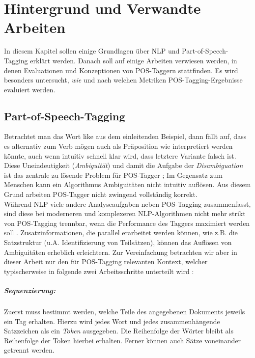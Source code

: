 %
\chapter{Hintergrund und Verwandte Arbeiten}
\label{sec:related}

In diesem Kapitel sollen einige Grundlagen über NLP und Part-of-Speech-Tagging erklärt werden. Danach soll auf einige Arbeiten verwiesen werden, in denen Evaluationen und Konzeptionen von POS-Taggern stattfinden. Es wird besonders untersucht, \textit{wie} und nach welchen Metriken POS-Tagging-Ergebnisse evaluiert werden.

\section{Part-of-Speech-Tagging}
\label{sec:related:pos}

Betrachtet man das Wort \glqq like\grqq{} aus dem einleitenden Beispiel, dann fällt auf, dass es alternativ zum Verb \glqq mögen\grqq{} auch als Präposition \glqq wie\grqq{} interpretiert werden könnte, auch wenn intuitiv schnell klar wird, dass letztere Variante falsch ist. Diese Uneindeutigkeit (\textit{Ambiguität}) und damit die Aufgabe der \textit{Disambiguation} ist das zentrale zu lösende Problem für POS-Tagger  \cite{Smith} \cite{Jones}; Im Gegensatz zum Menschen kann ein Algorithmus Ambiguitäten nicht intuitiv auflösen. Aus diesem Grund arbeiten POS-Tagger nicht zwingend vollständig korrekt.
\\
Während NLP viele andere Analyseaufgaben neben POS-Tagging zusammenfasst, sind diese bei moderneren und komplexeren NLP-Algorithmen nicht mehr strikt von POS-Tagging trennbar, wenn die Performance des Taggers maximiert werden soll \cite{Smith}. Zusatzinformationen, die parallel erarbeitet werden können, wie z.B. die Satzstruktur (u.A. Identifizierung von Teilsätzen), können das Auflösen von Ambiguitäten erheblich erleichtern. Zur Vereinfachung betrachten wir aber in dieser Arbeit nur den für POS-Tagging relevanten Kontext, welcher typischerweise in folgende zwei Arbeitsschritte unterteilt wird \cite{Smith}:

\paragraph{Sequenzierung:} Zuerst muss bestimmt werden, welche Teile des angegebenen Dokuments jeweils ein Tag erhalten. Hierzu wird jedes Wort und jedes zusammenhängende Satzzeichen als ein \textit{Token} ausgegeben. Die Reihenfolge der Wörter bleibt als Reihenfolge der Token hierbei erhalten. Ferner können auch Sätze voneinander getrennt werden.
